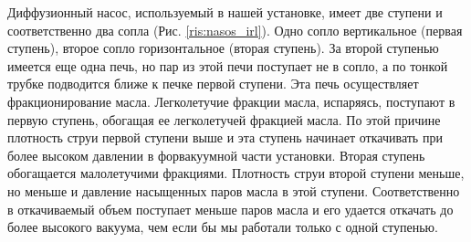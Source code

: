 \documentclass[a4paper, 12pt]{article}
\begin{document}
    Диффузионный насос, используемый в нашей установке, имеет две ступени и соответственно два сопла (Рис. \ref{ris:nasos_irl}). Одно сопло вертикальное (первая ступень), второе сопло горизонтальное (вторая ступень). За второй ступенью имеется еще одна печь, но пар из этой печи поступает не в сопло, а по тонкой трубке подводится ближе к печке первой ступени. Эта печь осуществляет фракционирование масла. Легколетучие фракции масла, испаряясь, поступают в первую ступень, обогащая ее легколетучей фракцией масла. По этой причине плотность струи первой ступени выше и эта ступень начинает откачивать при более высоком давлении в форвакуумной части установки. Вторая ступень обогащается малолетучими фракциями. Плотность струи второй ступени меньше, но меньше и давление насыщенных паров масла в этой ступени. Соответственно в откачиваемый объем поступает меньше паров масла и его удается откачать до более высокого вакуума, чем если бы мы работали только с одной ступенью.
\end{document}
